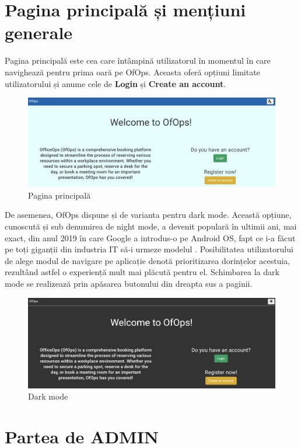 \section{Pagina principală și mențiuni generale}

Pagina principală este cea care întâmpină utilizatorul în momentul în care navighează pentru prima oară pe OfOps. Aceasta oferă opțiuni limitate utilizatorului și anume cele de \textbf{Login} și \textbf{Create an account}.

\begin{figure}[!htb]
    \centering
    \includegraphics[width=0.9\linewidth]{images/pagina-nelogat.png}
    \caption{Pagina principală}
    \label{fig:principal}
\end{figure}

De asemenea, OfOps dispune și de varianta pentru dark mode. Această opțiune, cunoscută și sub denumirea de night mode, a devenit populară în ultimii ani, mai exact, din anul 2019 în care Google a introdus-o pe Android OS, fapt ce i-a făcut pe toți giganții din industria IT să-i urmeze modelul \cite{citation9}. Posibilitatea utilizatorului de alege modul de navigare pe aplicație denotă prioritizarea dorințelor acestuia, rezultând astfel o experiență mult mai plăcută pentru el. Schimbarea la dark mode se realizează prin apăsarea butonului din dreapta sus a paginii.

\begin{figure}[!htb]
    \centering
    \includegraphics[width=0.9\linewidth]{images/dark.png}
    \caption{Dark mode}
    \label{fig:dark}
\end{figure}

\section{Partea de ADMIN}

